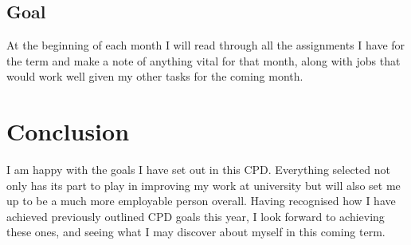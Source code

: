 \documentclass{scrartcl}
\begin{document}
\subsection{Goal}
At the beginning of each month I will read through all the assignments I have for the term and make a note of anything vital for that month, along with jobs that would work well given my other tasks for the coming month.

\section{Conclusion}
I am happy with the goals I have set out in this CPD. Everything selected not only has its part to play in improving my work at university but will also set me up to be a much more employable person overall. Having recognised how I have achieved previously outlined CPD goals this year, I look forward to achieving these ones, and seeing what I may discover about myself in this coming term. 
\end{document}
